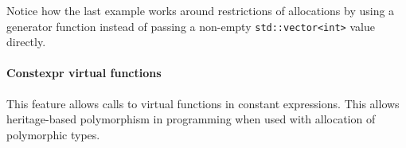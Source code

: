 \documentclass[../../main.tex]{subfiles}
\begin{document}
Notice how the last example works around restrictions of \constexpr allocations
by using a generator function instead of passing a non-empty
\lstinline|std::vector<int>| value directly.


\paragraph{Constexpr virtual functions} This feature allows calls to virtual
functions in constant expressions\cite{virtual-constexpr}. This allows
heritage-based polymorphism in \constexpr programming when used with
\constexpr allocation of polymorphic types.

%
%


%
\end{document}
